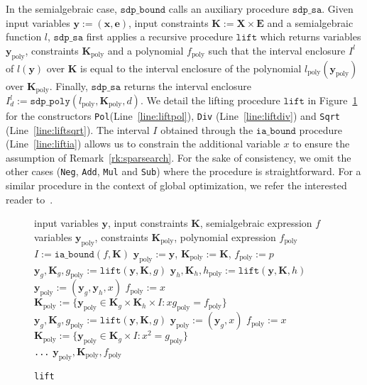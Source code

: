 \documentclass[preprint]{sigplanconf}
\newcommand{\code}[1]{\lstinline{#1}}
\newcommand{\x}{\mathbf{x}}
\newcommand{\e}{\mathbf{e}}
\newcommand{\y}{\mathbf{y}}
\newcommand{\f}{\mathbf{f}}
\def\f{f}
\def\E{\mathbf{E}}
\def\K{\mathbf{K}}
\def\X{\mathbf{X}}
\newcommand{\iaboundfun}[2]{\mathtt{ia\_bound}(#1, #2)}
\newcommand{\iabound}{\mathtt{ia\_bound}}
\newcommand{\sdpbound}{\mathtt{sdp\_bound}}
\newcommand{\sdppolyfun}[3]{\mathtt{sdp\_poly}(#1, #2, #3)}
\newcommand{\liftfun}[3]{\mathtt{lift}(#1, #2, #3)}
\newcommand{\lift}{\mathtt{lift}}
\newcommand{\poly}{_\text{poly}}
\newcommand{\sdpsa}{\mathtt{sdp\_sa}}
\theoremstyle{plain}
\begin{document}
In the semialgebraic case, $\sdpbound$ calls an auxiliary procedure $\sdpsa$. 
Given input variables $\y := (\x,\e)$, input constraints $\K := \X \times \E$ and a 
semialgebraic function $l$,  $\sdpsa$ first applies a recursive procedure $\lift$ 
which returns variables $\y\poly$, constraints $\K\poly$ and a polynomial $f\poly$ such that the 
interval enclosure $I^l$ of $l(\y)$ over $\K$ is equal to the interval enclosure of 
the polynomial $l\poly(\y\poly)$ over $\K\poly$. 
Finally, $\sdpsa$ returns the interval enclosure $I^l_d := \sdppolyfun{l\poly}{\K\poly}{d}$. We detail the lifting procedure $\lift$ in Figure~\ref{alg:lift} for the constructors \code{Pol}(Line~\eqref{line:liftpol}), \code{Div} (Line~\eqref{line:liftdiv}) and \code{Sqrt} (Line~\eqref{line:liftsqrt}). 
The interval $I$ obtained through the $\iabound$ procedure (Line~\eqref{line:liftia}) allows us to constrain the additional variable $x$ to ensure the assumption of Remark~\ref{rk:sparsearch}.
For the sake of consistency, we omit the other cases (\code{Neg}, \code{Add}, \code{Mul} and \code{Sub}) where the procedure is straightforward. For a similar procedure in the context of global optimization, we refer the interested reader to~\cite[Chapter 2]{MagronPhD}.

\begin{figure}[!ht]
\begin{algorithmic}[1]                 
\Require input variables $\y$, input constraints $\K$, semialgebraic expression $f$
\Ensure variables $\y\poly$, constraints $\K\poly$, polynomial expression $f\poly$
    \State $I := \iaboundfun{f}{\K}$ \label{line:liftia}
	 \label{line:liftpol} $\y\poly := \y$, $\K\poly := \K$, $\f\poly := p$
	 \label{line:liftdiv} 
	\State $\y_g, \K_g, g\poly := \liftfun{\y}{\K}{g}$ 
	\State $\y_h, \K_h, h\poly := \liftfun{\y}{\K}{h}$
    \State $\y\poly := (\y_g,\y_h,x)$ \hspace{1cm} $f\poly := x$ 
	\State $\K\poly := \{\y\poly \in \K_g \times \K_h \times I : x g\poly = f\poly \}$
	 \label{line:liftsqrt} 
	\State $\y_g, \K_g, g\poly := \liftfun{\y}{\K}{g}$ 
	\State $\y\poly := (\y_g,x)$ \hspace{1cm} $f\poly := x$ 
	\State $\K\poly := \{\y\poly \in \K_g \times I : x^2 = g\poly \}$\\
\code{...}
	\EndIf
%
\State \Return $\y\poly, \K\poly, f\poly$
\end{algorithmic}
\caption{\code{lift}}
\label{alg:lift}
\end{figure}
\end{document}
